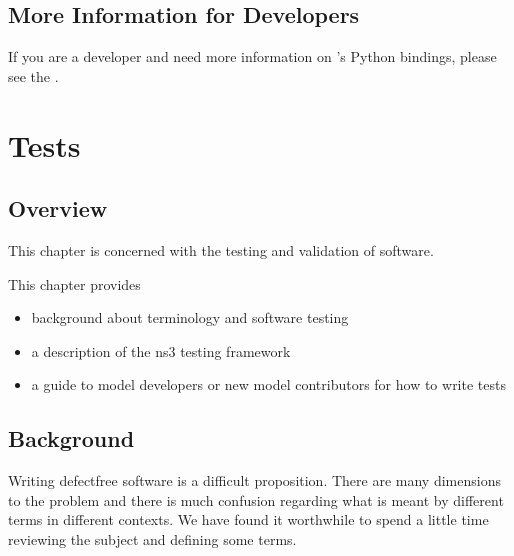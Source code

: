 \documentclass[letterpaper,10pt,english]{sphinxmanual}
\begin{document}
\section{More Information for Developers}
\label{\detokenize{python:more-information-for-developers}}
If you are a developer and need more information on ’s Python bindings, please see the .


\chapter{Tests}
\label{\detokenize{tests:tests}}\label{\detokenize{tests::doc}}

\section{Overview}
\label{\detokenize{test-overview:overview}}\label{\detokenize{test-overview::doc}}
This chapter is concerned with the testing and validation of  software.

This chapter provides
\begin{itemize}
\item {} 
background about terminology and software testing

\item {} 
a description of the ns\sphinxhyphen{}3 testing framework

\item {} 
a guide to model developers or new model contributors for how to write tests

\end{itemize}


\section{Background}
\label{\detokenize{test-background:background}}\label{\detokenize{test-background::doc}}

Writing defect\sphinxhyphen{}free software is a difficult proposition.  There are many
dimensions to the problem and there is much confusion regarding what is
meant by different terms in different contexts.  We have found it worthwhile
to spend a little time reviewing the subject and defining some terms.
\end{document}
